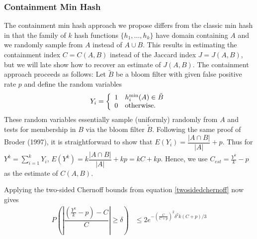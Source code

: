 \documentclass[11pt,reqno]{amsart}
\theoremstyle{remark}
\numberwithin{equation}{section}
\newcommand{\containX}{Y}
\begin{document}
\subsubsection{Containment Min Hash}
The containment min hash approach we propose differs from the classic min hash in that the family of $k$ hash functions $\{h_1,\dots, h_k\}$ have domain containing $A$ and we randomly sample from $A$ instead of $A\cup B$. This results in estimating the containment index $C=C(A,B)$ instead of the Jaccard index $J=J(A,B)$, but we will late show how to recover an estimate of $J(A,B)$. The containment approach proceeds as follows: Let $\tilde{B}$ be a bloom filter with given false positive rate $p$ and define the random variables
$$
\containX_i=\left\{
\begin{array}{lll}
1 &h_i^{\rm min}(A)\in \tilde{B}\\
0& {\rm otherwise}.
\end{array}
\right.
$$
These random variables essentially sample (uniformly) randomly from $A$ and tests for membership in $B$ via the bloom filter $\tilde{B}$. Following the same proof of Broder (1997), it is straightforward to show that $E(\containX_i)=\dfrac{|A\cap B|}{|A|}+p$. Thus for $\containX^k=\sum\limits_{i=1}^k \containX_i$, $E(\containX^k)=k\dfrac{|A\cap B|}{|A|}+kp = kC + kp$. Hence, we use $C_{est}=\frac{\containX^k}{k}-p$ as the estimate of $C(A,B)$.

Applying the two-sided Chernoff bounds from equation \eqref{twosidedchernoff} now gives
\begin{align}
\label{eqn:ContainChernoff}
P\left(
\left|\dfrac{\left(\frac{\containX^k}{k}-p\right)-C}{C}\right|\geq \delta\right)
&\leq 2e^{-\left(\frac{C}{C+p}\right)^2\delta^2k(C+p)/3}
\end{align}

\end{document}
